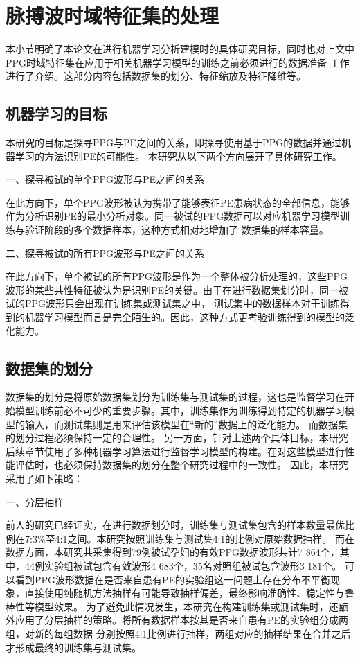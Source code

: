 \section{脉搏波时域特征集的处理}
本小节明确了本论文在进行机器学习分析建模时的具体研究目标，同时也对上文中PPG时域特征集在应用于相关机器学习模型的训练之前必须进行的数据准备
工作进行了介绍。这部分内容包括数据集的划分、特征缩放及特征降维等。
\subsection{机器学习的目标}
本研究的目标是探寻PPG与PE之间的关系，即探寻使用基于PPG的数据并通过机器学习的方法识别PE的可能性。
本研究从以下两个方向展开了具体研究工作。

一、探寻被试的单个PPG波形与PE之间的关系

在此方向下，单个PPG波形被认为携带了能够表征PE患病状态的全部信息，能够作为分析识别PE的最小分析对象。同一被试的PPG数据可以对应机器学习模型训练与验证阶段的多个数据样本，这种方式相对地增加了
数据集的样本容量。

二、探寻被试的所有PPG波形与PE之间的关系

在此方向下，单个被试的所有PPG波形是作为一个整体被分析处理的，这些PPG波形的某些共性特征被认为是识别PE的关键。由于在进行数据集划分时，同一被试的PPG波形只会出现在训练集或测试集之中，
测试集中的数据样本对于训练得到的机器学习模型而言是完全陌生的。因此，这种方式更考验训练得到的模型的泛化能力。

\subsection{数据集的划分}
数据集的划分是将原始数据集划分为训练集与测试集的过程，这也是监督学习在开始模型训练前必不可少的重要步骤。其中，训练集作为训练得到特定的机器学习模型的输入，而测试集则是用来评估该模型在“新的”数据上的泛化能力。
而数据集的划分过程必须保持一定的合理性。
另一方面，针对上述两个具体目标，本研究后续章节使用了多种机器学习算法进行监督学习模型的构建。在对这些模型进行性能评估时，也必须保持数据集的划分在整个研究过程中的一致性。
因此，本研究采用了如下策略：

一、分层抽样

前人的研究已经证实，在进行数据划分时，训练集与测试集包含的样本数量最优比例在7:3\%至4:1之间\cite{Gholamy2018Why7O}。本研究按照训练集与测试集4:1的比例对原始数据抽样。
而在数据方面，本研究共采集得到79例被试孕妇的有效PPG数据波形共计7 864个，其中，44例实验组被试包含有效波形4 683个，35名对照组被试包含波形3 181个。
可以看到PPG波形数据在是否来自患有PE的实验组这一问题上存在分布不平衡现象，直接使用纯随机方法抽样有可能导致抽样偏差，最终影响准确性、稳定性与鲁棒性等模型效果\cite{Aurélien2018}。
为了避免此情况发生，本研究在构建训练集或测试集时，还额外应用了分层抽样的策略。将所有数据样本按其是否来自患有PE的实验组分成两组，对新的每组数据
分别按照4:1比例进行抽样，两组对应的抽样结果在合并之后才形成最终的训练集与测试集。

